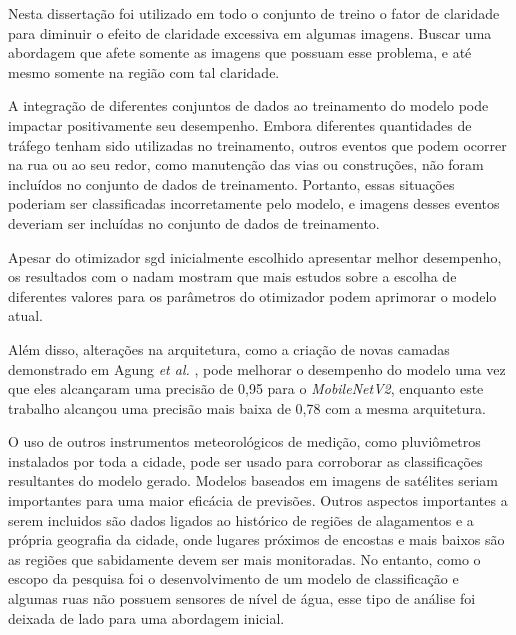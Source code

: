 Nesta dissertação foi utilizado em todo o conjunto de treino o fator de claridade para diminuir o efeito de claridade excessiva em algumas imagens.
Buscar uma abordagem que afete somente as imagens que possuam esse problema, e até mesmo somente na região com tal claridade.

A integração de diferentes conjuntos de dados ao treinamento do modelo pode impactar positivamente seu desempenho.
Embora diferentes quantidades de tráfego tenham sido utilizadas no treinamento, outros eventos que podem ocorrer na rua ou ao seu redor, como manutenção das vias ou construções, 
não foram incluídos no conjunto de dados de treinamento. 
Portanto, essas situações poderiam ser classificadas incorretamente pelo modelo, e imagens desses eventos deveriam ser incluídas no conjunto de dados de treinamento.

Apesar do otimizador \acrshort{sgd} inicialmente escolhido apresentar melhor desempenho, 
os resultados com o \acrshort{nadam} mostram que mais estudos sobre a escolha de diferentes valores para os parâmetros do otimizador podem aprimorar o modelo atual.

Além disso, alterações na arquitetura, como a criação de novas camadas demonstrado em Agung \textit{et al.} \cite{agung2023}, 
pode melhorar o desempenho do modelo uma vez que eles alcançaram uma precisão de 0,95 para o \textit{MobileNetV2}, 
enquanto este trabalho alcançou uma precisão mais baixa de 0,78 com a mesma arquitetura.

O uso de outros instrumentos meteorológicos de medição, como pluviômetros instalados por toda a cidade, pode ser usado para corroborar as classificações resultantes do modelo gerado. 
Modelos baseados em imagens de satélites seriam importantes para uma maior eficácia de previsões.
Outros aspectos importantes a serem incluidos são dados ligados ao histórico de regiões de alagamentos e a própria geografia da cidade, onde lugares próximos de encostas e mais baixos são as regiões que sabidamente devem ser mais monitoradas. 
No entanto, como o escopo da pesquisa foi o desenvolvimento de um modelo de classificação e algumas ruas não possuem sensores de nível de água, 
esse tipo de análise foi deixada de lado para uma abordagem inicial.
